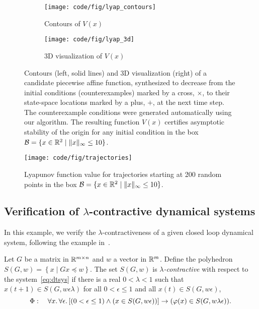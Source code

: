 \begin{figure}[htpb]
    \centering
    \begin{subfigure}[b]{0.49\linewidth}
        \centering
		\texttt{[image: code/fig/lyap\_contours]}
        \caption{Contours of $V(x)$}
		\label{fig:lyap_contours}
    \end{subfigure}
    \begin{subfigure}[b]{0.49\linewidth}
        \centering
		\texttt{[image: code/fig/lyap\_3d]}
        \caption{3D visualization of $V(x)$}
		\label{fig:lyap_3d}
    \end{subfigure}
	\caption{Contours (left, solid lines) and 3D visualization (right) of a
	candidate piecewise affine function, synthesized to decrease from the
	initial conditions (counterexamples) marked by a cross, $\times$, to their
	state-space locations marked by a plus, $+$, at the next time step. The
	counterexample conditions were generated automatically using our algorithm.
	The resulting function $V(x)$ certifies asymptotic stability of the origin
	for any initial condition in the box $\mathcal{B}=\{x\in\mathbb{R}^2 \mid
	\|x\|_\infty \leq 10\}$.}
    \label{fig:lyap}
\end{figure}

\begin{figure}[htpb]
    \centering
    \texttt{[image: code/fig/trajectories]}
	\caption{Lyapunov function value for trajectories starting at 200 random
	points in the box $\mathcal{B}=\{x\in\mathbb{R}^2 \mid \|x\|_\infty \leq 10\}$.}
    \label{fig:trajectories}
\end{figure}

\subsection{Verification of $\lambda$-contractive dynamical systems}
In this example, we verify the $\lambda$-contractiveness of a given closed loop
dynamical system, following the example in~\cite{Milani:1999}.
\begin{definition}
	Let $G$ be a matrix in $\mathbb{R}^{m\times n}$ and $w$ a vector in $\mathbb{R}^m$. 
	Define the polyhedron $S(G,w) = \left\lbrace x \mid Gx \preceq w \right\rbrace
	$. The set $S(G,w)$ is \emph{$\lambda$-contractive} with respect to the
	system~\eqref{eq:dtsys} 
	if there is a real $0<\lambda<1$ such that $x(t+1) \in
	S(G,w\epsilon\lambda)$ for all $0< \epsilon \leq 1$ and all $x(t)\in
	S(G,w\epsilon)$, \ie
	\begin{equation*}
		\Phi: \quad 
		\forall x .\, 
		\forall \epsilon .\,
		[(0<\epsilon\leq 1) \wedge (x\in S(G,w\epsilon))]
		\rightarrow (\varphi(x)\in S(G,w\lambda \epsilon)).
	\end{equation*}
\end{definition}


